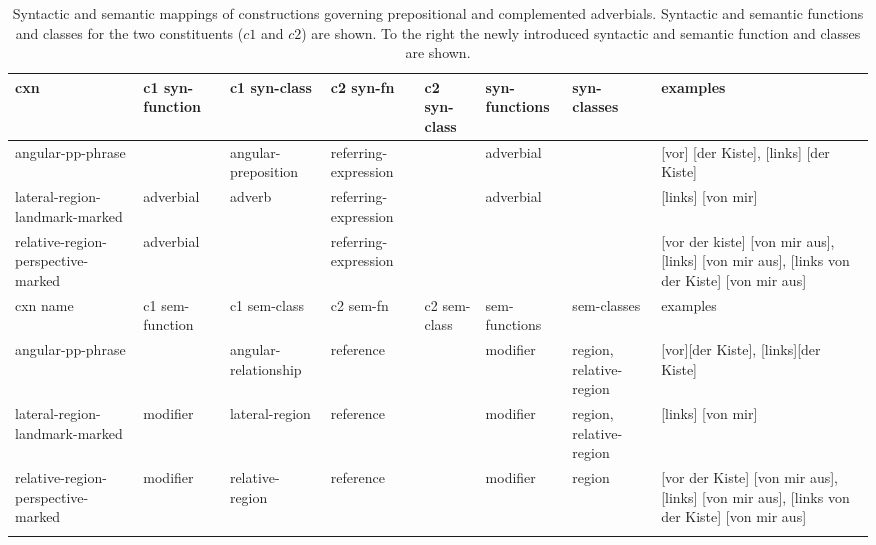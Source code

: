 \begin{sidewaystable}
\begin{footnotesize}
\begin{tabular}{p{1.6cm}p{1.6cm}p{1.6cm}p{1.6cm}p{1.6cm}p{1.4cm}p{1.4cm}p{3.5cm}}
\lsptoprule
cxn &  c1 syn-\newline function & c1 syn-class &  c2 syn-fn & c2 syn-class  & syn-functions & syn-classes & examples \\ \midrule
angular-pp-phrase & & angular-preposition & referring-expression & & adverbial & &[vor] [der Kiste], [links] [der Kiste]
\\ \hline  
lateral-region-landmark-marked  & adverbial &adverb & referring-expression & & adverbial & & [links] [von mir] 
\\ \hline  
relative-region-perspective-marked  &adverbial & &referring-expression & & & &
[vor der kiste] [von mir aus], [links] [von mir aus], [links von der Kiste] [von mir aus] 
\\ 
\hline
\hline
cxn name &  c1 sem-\newline function & c1 sem-class &  c2 sem-fn & c2 sem-class  & sem-functions & sem-classes & examples \\ \hline\hline
angular-pp-phrase & & angular-relationship & reference & & modifier & region, relative-region & [vor][der Kiste], [links][der Kiste]
\\ \hline
lateral-region-landmark-marked  & modifier & lateral-region & reference & & modifier & region, relative-region & [links] [von mir] 
\\ \hline
relative-region-perspective-marked  & modifier & relative-region &reference & &modifier & region &
[vor der Kiste] [von mir aus],[links] [von mir aus], [links von der Kiste] [von mir aus] 
\\ \lspbottomrule
\end{tabular}
\end{footnotesize}
\label{t:landmark-perspective-cxns}
\caption[Syntactic and semantic mappings of constructions]{%
Syntactic and semantic mappings of constructions 
governing prepositional and complemented adverbials. Syntactic and semantic
functions and classes for the two constituents ($c1$ and $c2$) are shown. To the right
the newly introduced syntactic and semantic function and classes are shown.}
\end{sidewaystable}

